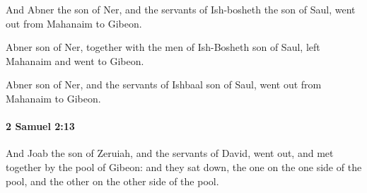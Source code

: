 			\begin{versebox}
					\item[BHS] 
					\item[ASV] And Abner the son of Ner, and the servants of Ish-bosheth the son of Saul, went out from Mahanaim to Gibeon.
					\item[NIV] Abner son of Ner, together with the men of Ish-Bosheth son of Saul, left Mahanaim and went to Gibeon.
					\item[NRSV] Abner son of Ner, and the servants of Ishbaal son of Saul, went out from Mahanaim to Gibeon.
			\end{versebox}

		\paragraph{2 Samuel 2:13} %
			\label{2SAMUEL-2-13}

			And Joab the son of Zeruiah, and the servants of David, went out, and met together by the pool of Gibeon: and they sat down, the one on the one side of the pool, and the other on the other side of the pool.


